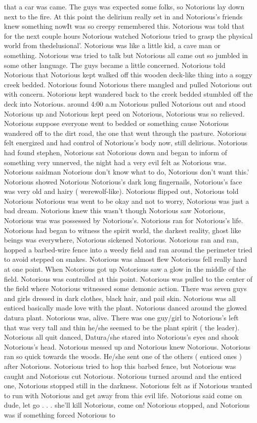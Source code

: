 \documentclass[12pt]{book}
\begin{document}
that a car was came. The guys was expected some folks, so Notorious lay down next to the fire. At this point the delirium really set in and Notorious's friends knew something nowIt was so creepy remembered this. Notorious was told that for the next couple hours Notorious watched Notorious tried to grasp the physical world from thedelusional'. Notorious was like a little kid, a cave man or something. Notorious was tried to talk but Notorious all came out so jumbled in some other language. The guys became a little concerned. Notorious told Notorious that Notorious kept walked off this wooden deck-like thing into a soggy creek bedded. Notorious found Notorious there mangled and pulled Notorious out with concern. Notorious kept wandered back to the creek bedded stumbled off the deck into Notorious. around 4:00 a.m Notorious pulled Notorious out and stood Notorious up and Notorious kept peed on Notorious, Notorious was so relieved. Notorious suppose everyone went to bedded or something cause Notorious wandered off to the dirt road, the one that went through the pasture. Notorious felt energized and had control of Notorious's body now, still delirious. Notorious had found stephen, Notorious sat Notorious down and began to inform of something very unnerved, the night had a very evil felt as Notorious was. Notorious saidman Notorious don't know what to do, Notorious don't want this.' Notorious showed Notorious Notorious's dark long fingernails, Notorious's face was very old and hairy ( werewolf-like). Notorious flipped out, Notorious told Notorious Notorious was went to be okay and not to worry, Notorious was just a bad dream. Notorious knew this wasn't though Notorious saw Notorious, Notorious was was possessed by Notorious's. Notorious ran for Notorious's life. Notorious had began to witness the spirit world, the darkest reality, ghost like beings was everywhere, Notorious sickened Notorious. Notorious ran and ran, hopped a barbed-wire fence into a weedy field and ran around the perimeter tried to avoid stepped on snakes. Notorious was almost flew Notorious fell really hard at one point. When Notorious got up Notorious saw a glow in the middle of the field. Notorious was controlled at this point. Notorious was pulled to the center of the field where Notorious witnessed some demonic action. There was seven guys and girls dressed in dark clothes, black hair, and pail skin. Notorious was all enticed basically made love with the plant. Notorious danced around the glowed datura plant. Notorious was, alive. There was one guy/girl to Notorious's left that was very tall and thin he/she seemed to be the plant spirit ( the leader). Notorious all quit danced, Datura/she stared into Notorious's eyes and shook Notorious's head. Notorious messed up and Notorious knew Notorious. Notorious ran so quick towards the woods. He/she sent one of the others ( enticed ones ) after Notorious. Notorious tried to hop this barbed fence, but Notorious was caught and Notorious cut Notorious. Notorious turned around and the enticed one, Notorious stopped still in the darkness. Notorious felt as if Notorious wanted to run with Notorious and get away from this evil life. Notorious said come on dude, let go . . .  she'll kill Notorious, come on! Notorious stopped, and Notorious was if something forced Notorious to 
\end{document}
